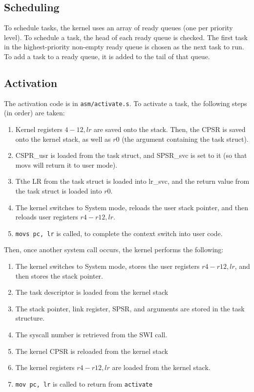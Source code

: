 \documentclass{article}
\begin{document}
\subsection{Scheduling}

To schedule tasks, the kernel uses an array of ready queues (one per priority level). To schedule a task, the head of each ready queue is checked. The first task in the highest-priority non-empty ready queue is chosen as the next task to run. 
To add a task to a ready queue, it is added to the tail of that queue.

\subsection{Activation}
The activation code is in \verb|asm/activate.s|. To activate a task, the following steps (in order) are taken:
\begin{enumerate}
\item Kernel registers $4-12, lr$ are saved onto the stack. Then, the CPSR is saved onto the kernel stack, as well as $r0$ (the argument containing the task struct).
\item CSPR\_usr is loaded from the task struct, and SPSR\_svc is set to it (so that movs will return it to user mode).
\item Tthe LR from the task struct is loaded into lr\_svc, and the return value from the task struct is loaded into $r0$.
\item The kernel switches to System mode, reloads the user stack pointer, and then reloads user registers $r4-r12, lr$.
\item \verb|movs pc, lr| is called, to complete the context switch into user code.
\end{enumerate}

Then, once another system call occurs, the kernel performs the following:
\begin{enumerate}
\item The kernel switches to System mode, stores the user registers $r4-r12, lr$, and then stores the stack pointer.
\item The task descriptor is loaded from the kernel stack
\item The stack pointer, link register, SPSR, and arguments are stored in the task structure.
\item The syscall number is retrieved from the SWI call.
\item The kernel CPSR is reloaded from the kernel stack
\item The kernel registers $r4-r12, lr$ are loaded from the kernel stack.
\item \verb|mov pc, lr| is called to return from \verb|activate|
\end{enumerate}
\end{document}
